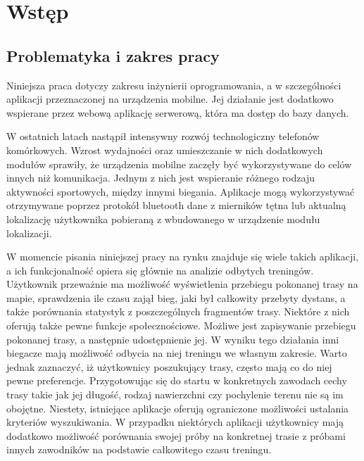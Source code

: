 \chapter{Wstęp}\label{chap:introduction}

\section{Problematyka i zakres pracy}
Niniejsza praca dotyczy zakresu inżynierii oprogramowania, a w szczególności aplikacji przeznaczonej na urządzenia mobilne. Jej działanie jest dodatkowo wspierane przez webową aplikację serwerową, która ma dostęp do bazy danych.

W ostatnich latach nastąpił intensywny rozwój technologiczny telefonów komórkowych. Wzrost wydajności oraz umieszczanie w nich dodatkowych modułów sprawiły, że urządzenia mobilne zaczęły być wykorzystywane do celów innych niż komunikacja. Jednym z nich jest wspieranie różnego rodzaju aktywności sportowych, między innymi biegania. Aplikacje mogą wykorzystywać otrzymywane poprzez protokół bluetooth dane z mierników tętna lub aktualną lokalizację użytkownika pobieraną z wbudowanego w urządzenie modułu lokalizacji.

W momencie pisania niniejszej pracy na rynku znajduje się wiele takich aplikacji, a ich funkcjonalność opiera się głównie na analizie odbytych treningów. Użytkownik przeważnie ma możliwość wyświetlenia przebiegu pokonanej trasy na mapie, sprawdzenia ile czasu zajął bieg, jaki był całkowity przebyty dystans, a także porównania statystyk z poszczególnych fragmentów trasy. Niektóre z nich oferują także pewne funkcje społecznościowe. Możliwe jest zapisywanie przebiegu pokonanej trasy, a następnie udostępnienie jej. W wyniku tego działania inni biegacze mają możliwość odbycia na niej treningu we własnym zakresie. Warto jednak zaznaczyć, iż użytkownicy poszukujący trasy, często mają co do niej pewne preferencje. Przygotowując się do startu w konkretnych zawodach cechy trasy takie jak jej długość, rodzaj nawierzchni czy pochylenie terenu nie są im obojętne. Niestety, istniejące aplikacje oferują ograniczone możliwości ustalania kryteriów wyszukiwania. W przypadku niektórych aplikacji użytkownicy mają dodatkowo możliwość porównania swojej próby na konkretnej trasie z próbami innych zawodników na podstawie całkowitego czasu treningu.

